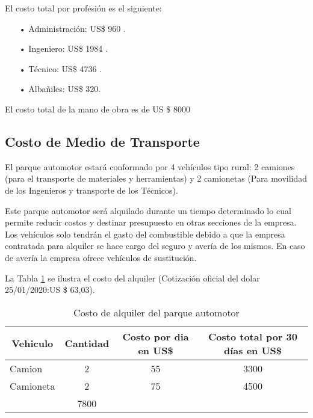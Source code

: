 El costo total por profesión es el siguiente:


\begin{itemize}


\item[•] Administración: US\$ 960 \cite{costo4}.%
\item[•] Ingeniero: US\$ 1984 \cite{costo1}.
\item[•]Técnico: US\$ 4736 \cite{costo2}.
\item[•]Albañiles: US\$ 320\cite{costo3}.



\end{itemize}


El costo total de la mano de obra es de US \$ 8000

\subsection{Costo de Medio de Transporte}

El parque automotor estará conformado por 4 vehículos tipo rural: 2 camiones (para el transporte de materiales y herramientas) y 2 camionetas (Para movilidad de los Ingenieros y transporte de los Técnicos).

Este parque automotor será alquilado durante un tiempo determinado lo cual permite reducir costos y destinar presupuesto en otras secciones de la empresa. Los vehículos solo tendrán el gasto del combustible debido a que la empresa contratada para alquiler se hace cargo del seguro y avería de los mismos. En caso de avería la empresa ofrece vehículos de sustitución.

La Tabla \ref{tab:costomovilidad} se ilustra el costo del alquiler (Cotización oficial del dolar 25/01/2020:US \$ 63,03).

\begin{table}[H]
  \centering
    \begin{tabular}{|c|c|c|c|}
    \hline
    \rowcolor[rgb]{ .773,  .851,  .945} \textbf{Vehiculo} & \textbf{Cantidad} & \textbf{Costo por dia en US\$} & \textbf{Costo total por 30 días en US\$} \bigstrut\\
    \hline
    \multicolumn{1}{|l|}{Camion} & 2     & 55    & 3300 \bigstrut\\
    \hline
    \multicolumn{1}{|l|}{Camioneta} & 2     & 75    & 4500 \bigstrut\\
    \hline
    \rowcolor[rgb]{ .773,  .851,  .945} \multicolumn{3}{|c|}{\textbf{Total}} & \cellcolor[rgb]{ 1,  1,  1}7800 \bigstrut\\
    \hline
    \end{tabular}%
  \caption{Costo de alquiler del parque automotor}
  \label{tab:costomovilidad}%
\end{table}%

